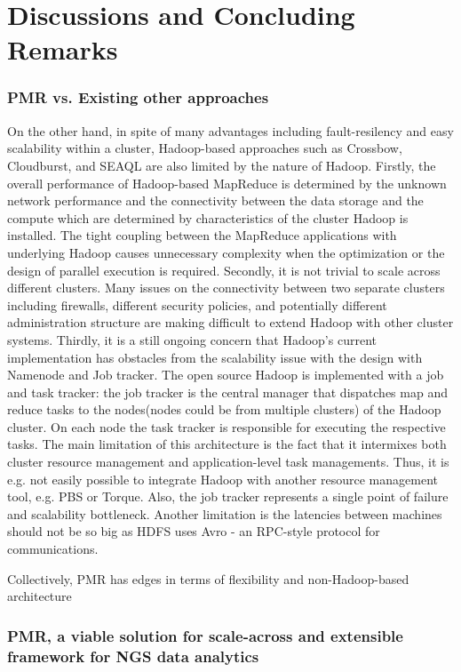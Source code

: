 \documentclass{sig-alternate}
\begin{document}
\section{Discussions and Concluding Remarks}\label{sec:discussions}
\subsubsection{PMR vs. Existing other approaches}

On the other hand, in spite of many advantages including fault-resilency and easy scalability within a cluster, Hadoop-based approaches such as Crossbow, Cloudburst, and SEAQL are also limited by the nature of Hadoop.  Firstly, the overall performance of Hadoop-based MapReduce is determined by the unknown network performance and the connectivity between the data storage and the compute which are determined by characteristics of the cluster Hadoop is installed.  The tight coupling between the MapReduce applications with underlying Hadoop causes unnecessary complexity when the optimization or the design of parallel execution is required.  Secondly, it is not trivial to scale across different clusters.  Many issues on the connectivity between two separate clusters including firewalls, different security policies, and potentially different administration structure are making difficult to extend Hadoop with other cluster systems.  Thirdly, it is a still ongoing concern that Hadoop's current implementation has obstacles from the scalability issue with the design with Namenode and Job tracker.   The open source Hadoop is implemented with a job and task tracker: the job tracker is the central manager that dispatches map and reduce tasks to the nodes(nodes could be from multiple clusters) of the Hadoop cluster. On each node the task tracker is responsible for executing the respective tasks. The main limitation of this architecture is the fact that it intermixes both cluster resource management and application-level task managements. Thus, it is e.g. not easily possible to integrate Hadoop with another resource management tool, e.g. PBS or Torque. Also, the job tracker represents a single point of failure and scalability bottleneck. Another limitation is the latencies between machines should not be so big as HDFS uses Avro - an RPC-style protocol for communications.

Collectively, PMR has edges in terms of flexibility and non-Hadoop-based architecture

\subsubsection{PMR, a viable solution for scale-across and extensible framework for NGS data analytics}
\end{document}
